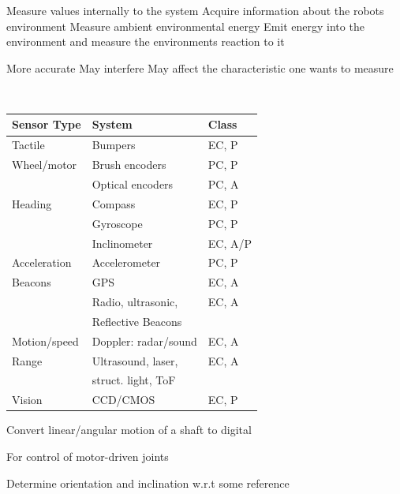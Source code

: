 \begin{itemize}
     Measure values internally to the system
     Acquire information about the robots environment
     Measure ambient environmental energy
     Emit energy into the environment and measure the environments reaction to it
        \begin{itemize*}
            \ipro More accurate
            \icon May interfere
            \icon May affect the characteristic one wants to measure
        \end{itemize*}
        \\ \begin{tabular}{l l l}
            Sensor Type & System & Class\\\hline
            Tactile & Bumpers & EC, P \\
            Wheel/motor & Brush encoders & PC, P \\
            & Optical encoders & PC, A \\
            Heading & Compass & EC, P \\
            & Gyroscope & PC, P \\
            & Inclinometer & EC, A/P \\
            Acceleration & Accelerometer & PC, P \\
            Beacons & GPS & EC, A \\
                & Radio, ultrasonic, & EC, A \\
                & Reflective Beacons \\
            Motion/speed & Doppler: radar/sound & EC, A \\
            Range & Ultrasound, laser, & EC, A \\
                & struct. light, ToF \\
            Vision & CCD/CMOS & EC, P
        \end{tabular}
        \begin{itemize*}
            \item Convert linear/angular motion of a shaft to digital
            \item For control of motor-driven joints
        \end{itemize*}
        \begin{itemize*}
            \item Determine orientation and inclination w.r.t some reference

\end{itemize*}
\end{itemize}
